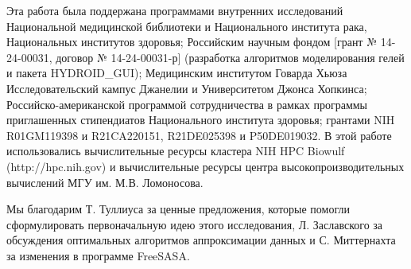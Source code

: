     Эта работа была поддержана программами внутренних исследований Национальной медицинской библиотеки и Национального института рака, Национальных институтов здоровья; Российским научным фондом [грант № 14-24-00031, договор № 14-24-00031-р] (разработка алгоритмов моделирования гелей и пакета HYDROID\_GUI); Медицинским институтом Говарда Хьюза Исследовательский кампус Джанелии и Университетом Джонса Хопкинса; Российско-американской программой сотрудничества в рамках программы приглашенных стипендиатов Национального института здоровья; грантами NIH  R01GM119398 и R21CA220151, R21DE025398 и P50DE019032. В этой работе использовались вычислительные ресурсы кластера NIH HPC Biowulf (http://hpc.nih.gov) и  вычислительные ресурсы центра высокопроизводительных вычислений МГУ им. М.В. Ломоносова.

    Мы благодарим Т. Туллиуса за ценные предложения, которые помогли сформулировать первоначальную идею этого исследования, Л. Заславского за обсуждения оптимальных алгоритмов аппроксимации данных и С. Миттернахта за изменения в программе FreeSASA.

    
    
    
    
    
    
    
    
    
    
    
    
    
    
    
    
    
    
    
    
    
    
    
    
    
    
    
